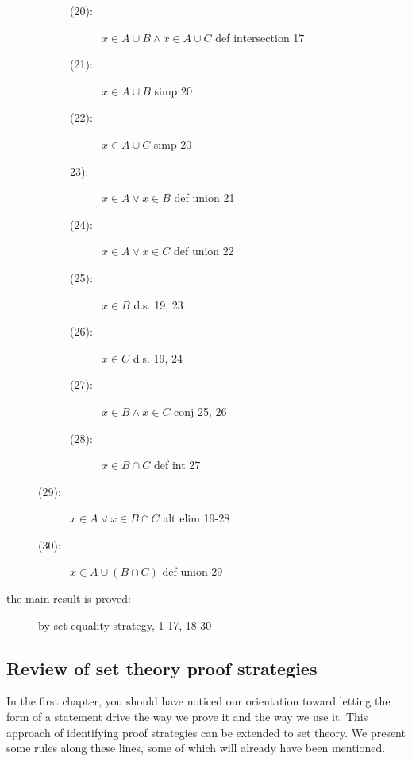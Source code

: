 \documentclass[12pt]{book}
\begin{document}
\begin{description}
\begin{description}
\begin{description}
\item[(20):]   $x \in A \cup B \wedge x \in A \cup C$  def intersection 17

\item[(21):]  $x \in A \cup B$ simp 20

\item[(22):]  $x \in A \cup C$  simp 20

\item[23):]  $x \in A \vee x \in B$  def union 21

\item[(24):]  $x \in A \vee x \in C$ def union 22

\item[(25):]  $x \in B$  d.s. 19, 23

\item[(26):]  $x \in C$  d.s. 19, 24

\item [(27):]  $x \in B \wedge x \in C$  conj 25, 26

\item[(28):]  $x \in B \cap C$  def int 27

\end{description}

\item[(29):]  $x \in A \vee x \in B \cap C$  alt elim 19-28

\item[(30):]  $x \in A \cup (B \cap C)$  def union 29

\end{description}

\item[the main result is proved:]  by set equality strategy, 1-17, 18-30

\end{description}

\newpage

\subsection{Review of set theory proof strategies}

In the first chapter, you should have noticed our orientation toward letting the form of a statement drive the way we prove it and the way we use it.  This approach of identifying proof strategies can be extended to set theory.  We present some rules along these lines, some of which will already have been mentioned.
\end{document}
